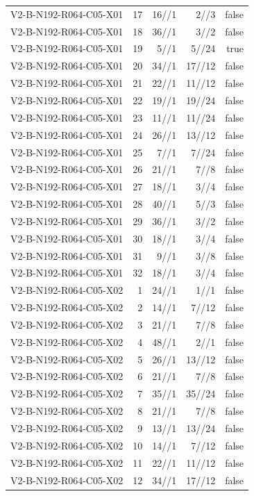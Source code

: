 {\begin{longtable}{lrrrr}
V2-B-N192-R064-C05-X01 & 17 & 16//1 & 2//3 & false \\
V2-B-N192-R064-C05-X01 & 18 & 36//1 & 3//2 & false \\
V2-B-N192-R064-C05-X01 & 19 & 5//1 & 5//24 & true \\
V2-B-N192-R064-C05-X01 & 20 & 34//1 & 17//12 & false \\
V2-B-N192-R064-C05-X01 & 21 & 22//1 & 11//12 & false \\
V2-B-N192-R064-C05-X01 & 22 & 19//1 & 19//24 & false \\
V2-B-N192-R064-C05-X01 & 23 & 11//1 & 11//24 & false \\
V2-B-N192-R064-C05-X01 & 24 & 26//1 & 13//12 & false \\
V2-B-N192-R064-C05-X01 & 25 & 7//1 & 7//24 & false \\
V2-B-N192-R064-C05-X01 & 26 & 21//1 & 7//8 & false \\
V2-B-N192-R064-C05-X01 & 27 & 18//1 & 3//4 & false \\
V2-B-N192-R064-C05-X01 & 28 & 40//1 & 5//3 & false \\
V2-B-N192-R064-C05-X01 & 29 & 36//1 & 3//2 & false \\
V2-B-N192-R064-C05-X01 & 30 & 18//1 & 3//4 & false \\
V2-B-N192-R064-C05-X01 & 31 & 9//1 & 3//8 & false \\
V2-B-N192-R064-C05-X01 & 32 & 18//1 & 3//4 & false \\
V2-B-N192-R064-C05-X02 & 1 & 24//1 & 1//1 & false \\
V2-B-N192-R064-C05-X02 & 2 & 14//1 & 7//12 & false \\
V2-B-N192-R064-C05-X02 & 3 & 21//1 & 7//8 & false \\
V2-B-N192-R064-C05-X02 & 4 & 48//1 & 2//1 & false \\
V2-B-N192-R064-C05-X02 & 5 & 26//1 & 13//12 & false \\
V2-B-N192-R064-C05-X02 & 6 & 21//1 & 7//8 & false \\
V2-B-N192-R064-C05-X02 & 7 & 35//1 & 35//24 & false \\
V2-B-N192-R064-C05-X02 & 8 & 21//1 & 7//8 & false \\
V2-B-N192-R064-C05-X02 & 9 & 13//1 & 13//24 & false \\
V2-B-N192-R064-C05-X02 & 10 & 14//1 & 7//12 & false \\
V2-B-N192-R064-C05-X02 & 11 & 22//1 & 11//12 & false \\
V2-B-N192-R064-C05-X02 & 12 & 34//1 & 17//12 & false \\

\end{longtable}}
